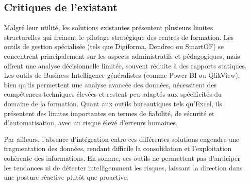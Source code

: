 \subsection{Critiques de l'existant}
Malgré leur utilité, les solutions existantes présentent plusieurs limites structurelles qui freinent le pilotage stratégique des centres de formation.
Les outils de gestion spécialisée (tels que Digiforma, Dendreo ou SmartOF) se concentrent principalement sur les aspects administratifs et pédagogiques, mais offrent une analyse décisionnelle limitée, souvent réduite à des rapports statiques.
Les outils de Business Intelligence généralistes (comme Power BI ou QlikView), bien qu’ils permettent une analyse avancée des données, nécessitent des compétences techniques élevées et restent peu adaptés aux spécificités du domaine de la formation.
Quant aux outils bureautiques tels qu’Excel, ils présentent des limites importantes en termes de fiabilité, de sécurité et d’automatisation, avec un risque élevé d’erreurs humaines.

\noindent Par ailleurs, l’absence d’intégration entre ces différentes solutions engendre une fragmentation des données, rendant difficile la consolidation et l’exploitation cohérente des informations.
En somme, ces outils ne permettent pas d'anticiper les tendances ni de détecter intelligemment les risques, laissant la direction dans une posture réactive plutôt que proactive.

